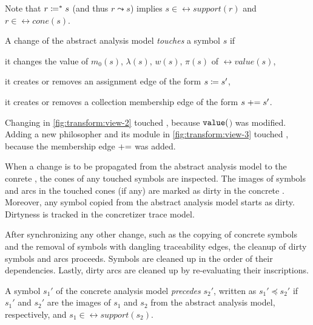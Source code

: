 Note that \(r \coloneq^* s\) (and thus \(r \leadsto s\)) implies \(s \in \rel{support}(r)\) and \(r \in \rel{cone}(s)\).

\begin{dfn}
  A change of the abstract analysis model \emph{touches} a symbol \(s\) if
  \begin{compactitem}
  \item it changes the value of \(m_0(s)\), \(\lambda(s)\), \(w(s)\), \(\pi(s)\) of \(\rel{value}(s)\),
  \item it creates or removes an assignment edge of the form \(s \coloneq s'\),
  \item it creates or removes a collection membership edge of the form \(s \mathrel{{+}{=}} s'\).
  \end{compactitem}
\end{dfn}

\begin{example}
  Changing  in \vref{fig:transform:view-2} touched , because \(\texttt{\upshape value}(\)\()\) was modified. Adding a new philosopher  and its  module  in \vref{fig:transform:view-3} touched , because the membership edge  \(\mathrel{{+}{=}}\)  was added.
\end{example}

When a change is to be propagated from the abstract analysis model to the conrete , the cones of any touched symbols are inspected. The images of symbols and arcs in the touched cones (if any) are marked as dirty in the concrete . Moreover, any symbol copied from the abstract analysis model starts as dirty. Dirtyness is tracked in the concretizer trace model.

After synchronizing any other change, such as the copying of concrete symbols and the removal of symbols with dangling traceability edges, the cleanup of dirty symbols and arcs proceeds. Symbols are cleaned up in the order of their dependencies. Lastly, dirty arcs are cleaned up by re-evaluating their inscriptions.

\begin{dfn}
  A symbol \(s_1'\) of the concrete analysis model \emph{precedes} \(s_2'\), written as \(s_1' \preceq s_2'\) if \(s_1'\) and \(s_2'\) are the images of \(s_1\) and \(s_2\) from the abstract analysis model, respectively, and \(s_1 \in \rel{support}(s_2)\).
\end{dfn}

